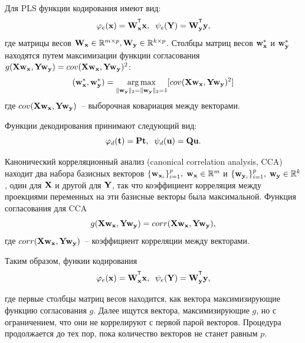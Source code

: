 \hrulefill

Для PLS  функции кодирования имеют вид:
\begin{equation}
	\varphi_e(\bx) = \bW_{\bx}^{\T}\bx , \;\;
	\psi_e(\bY) = \bW_{\by}^{\T}\by ,
\end{equation} 
где матрицы весов $\mathbf{W}_{\mathbf{x}} \in \mathbb{R}^{m \times p}, \mathbf{W}_{\mathbf{y}} \in \mathbb{R}^{k \times p}$. Столбцы матриц весов $\mathbf{w}_{\mathbf{x}}^{*}$ и $\mathbf{w}_{\mathbf{y}}^{*}$ 
находятся путем максимизации функции согласования $g(\mathbf{X} \mathbf{w}_{\mathbf{x}}, \mathbf{Y} \mathbf{w}_{\mathbf{y}}) = cov (\mathbf{X} \mathbf{w}_{\mathbf{x}}, \mathbf{Y} \mathbf{w}_{\mathbf{y}})^{2}$:
\begin{equation}
	(\mathbf{w}_{\mathbf{x}}^{*}, \mathbf{w}_{\mathbf{y}}^{*}) = \mathop{\arg \max}\limits_{\|\mathbf{w}_{\mathbf{y}}\|_{2}=\|\mathbf{w}_{\mathbf{y}}\|_{2}=1}[ cov(\mathbf{X} \mathbf{w}_{\mathbf{x}}, \mathbf{Y} \mathbf{w}_{\mathbf{y}})^{2}]
	\label{eq:PLSpr3}
\end{equation}
где $cov(\mathbf{X} \mathbf{w}_{\mathbf{x}}, \mathbf{Y} \mathbf{w}_{\mathbf{y}})$~-- выборочная ковариация между векторами.

Функции декодирования принимают следующий вид:
\begin{equation}
	\varphi_d(\mathbf{t}) = \mathbf{P}\mathbf{t}, \;\;
	\psi_d(\mathbf{u}) = \mathbf{Q}\mathbf{u}.
\end{equation} 

\hrulefill

Канонический корреляционный анализ (canonical correlation analysis, CCA) находит два набора базисных векторов $\{\mathbf{w}_{\mathbf{x}_i}\}_{i=1}^{p}, \; \mathbf{w}_{\mathbf{x}} \in \mathbb{R}^{m}$ и $\{\mathbf{w}_{\mathbf{y}_i}\}_{i=1}^{p}, \; \mathbf{w}_{\mathbf{y}} \in \mathbb{R}^{k}$, один для $\mathbf{X}$ и другой для $\mathbf{Y}$, так что коэффициент корреляция между проекциями переменных на эти базисные векторы была максимальной. Функция согласования для CCA
\begin{equation}
	g(\mathbf{X} \mathbf{w}_{\mathbf{x}}, \mathbf{Y} \mathbf{w}_{\mathbf{y}}) = corr(\mathbf{X} \mathbf{w}_{\mathbf{x}}, \mathbf{Y} \mathbf{w}_{\mathbf{y}}),
\end{equation} 
где $corr(\mathbf{X} \mathbf{w}_{\mathbf{x}}, \mathbf{Y} \mathbf{w}_{\mathbf{y}})$~-- коэффициент корреляции между векторами.

Таким образом, функии кодирования
\begin{equation}
	\varphi_e(\bx) = \bW_{\bx}^{\T}\bx , \;\;
	\psi_e(\bY) = \bW_{\by}^{\T}\by ,
\end{equation}

где первые столбцы матриц весов находится, как вектора максимизирующие функцию согласования $g$. Далее ищутся вектора, максимизирующие $g$, но с ограничением, что они не коррелируют с первой парой векторов. Процедура продолжается до тех пор, пока количество векторов не станет равным $p$. 
 
\hrulefill
 
